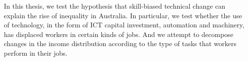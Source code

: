 In this thesis, we test the hypothesis that skill-biased technical change can explain the rise of inequality in Australia. In particular, we test whether the use of technology, in the form of ICT capital investment, automation and machinery, has displaced workers in certain kinds of jobs. And we attempt to decompose changes in the income distribution according to the type of tasks that workers perform in their jobs.

